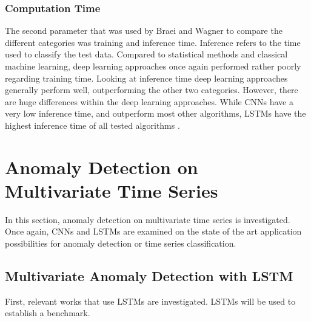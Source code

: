 \subsubsection{Computation Time}
The second parameter that was used by Braei and Wagner \parencite*{Braei2020} to compare the different categories was training and inference time. Inference refers to the time used to classify the test data. Compared to statistical methods and classical machine learning, deep learning approaches once again performed rather poorly regarding training time. Looking at inference time deep learning approaches generally perform well, outperforming the other two categories. However, there are huge differences within the deep learning approaches. While CNNs have a very low inference time, and outperform most other algorithms, LSTMs have the highest inference time of all tested algorithms \parencite{Braei2020}.  


\section{Anomaly Detection on Multivariate Time Series}
In this section, anomaly detection on multivariate time series is investigated. Once again, CNNs and LSTMs are examined on the state of the art application possibilities for anomaly detection or time series classification.

\subsection{Multivariate Anomaly Detection with LSTM}
First, relevant works that use LSTMs are investigated. LSTMs will be used to establish a benchmark.

